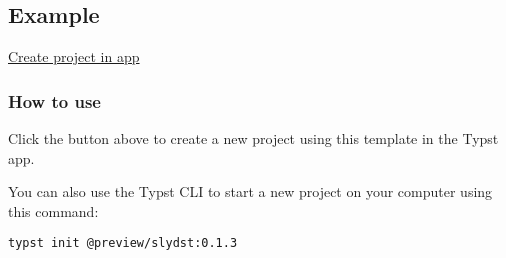 \subsection{Example}\label{example}

{

} {

} {

} {

} {

} {

} {

} {

} {

} {

}

\href{/app?template=slydst&version=0.1.3}{Create project in app}

\subsubsection{How to use}\label{how-to-use}

Click the button above to create a new project using this template in
the Typst app.

You can also use the Typst CLI to start a new project on your computer
using this command:

\begin{verbatim}
typst init @preview/slydst:0.1.3
\end{verbatim}

